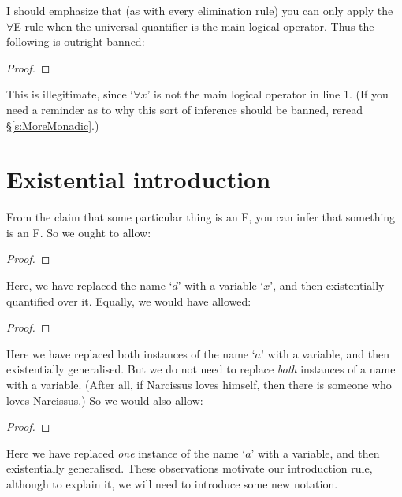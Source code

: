I should emphasize that (as with every elimination rule) you can only apply the $\forall$E rule when the universal quantifier is the main logical operator. Thus the following is outright banned:
\begin{proof}
\end{proof}
This is illegitimate, since `$\forall x$' is not the main logical operator in line 1. (If you need a reminder as to why this sort of inference should be banned, reread \S\ref{s:MoreMonadic}.)

\section{Existential introduction}
From the claim that some particular thing is an F, you can infer that something is an F. So we ought to allow:
\begin{proof}
	 
\end{proof}
Here, we have replaced the name `$d$' with a variable `$x$', and then existentially quantified over it. Equally, we would have allowed:
\begin{proof}
	 
\end{proof}
Here we have replaced both instances of the name `$a$' with a variable, and then existentially generalised. But we do not need to replace \emph{both} instances of a name with a variable. (After all, if Narcissus loves himself, then there is someone who loves Narcissus.) So we would also allow:
\begin{proof}
	 
\end{proof}
Here we have replaced \emph{one} instance of the name `$a$' with a variable, and then existentially generalised. These observations motivate our introduction rule, although to explain it, we will need to introduce some new notation.

